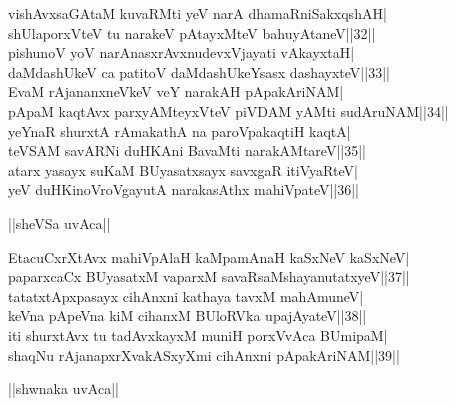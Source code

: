 \documentclass{article}
\begin{document}
vishAvxsaGAtaM kuvaRMti yeV narA dhamaRniSakxqshAH|\\
shUlaporxVteV tu narakeV pAtayxMteV bahuyAtaneV||32||\\
pishunoV yoV narAnasxrAvxnudevxVjayati vAkayxtaH|\\
daMdashUkeV ca patitoV daMdashUkeYsasx dashayxteV||33||\\
EvaM rAjananxneVkeV veY narakAH pApakAriNAM|\\
pApaM kaqtAvx parxyAMteyxVteV piVDAM yAMti sudAruNAM||34||\\
yeYnaR shurxtA rAmakathA na paroVpakaqtiH kaqtA|\\
teVSAM savARNi duHKAni BavaMti narakAMtareV||35||\\
atarx yasayx suKaM BUyasatxsayx savxgaR itiVyaRteV|\\
yeV duHKinoVroVgayutA narakasAthx mahiVpateV||36||\\

\begin{center}
||sheVSa uvAca||
\end{center}

EtacuCxrXtAvx mahiVpAlaH kaMpamAnaH kaSxNeV kaSxNeV|\\
paparxcaCx BUyasatxM vaparxM savaRsaMshayanutatxyeV||37||\\
tatatxtApxpasayx cihAnxni kathaya tavxM mahAmuneV|\\
keVna pApeVna kiM cihanxM BUloRVka upajAyateV||38||\\
iti shurxtAvx tu tadAvxkayxM muniH porxVvAca BUmipaM|\\
shaqNu rAjanapxrXvakASxyXmi cihAnxni pApakAriNAM||39||\\

\begin{center}
||shwnaka uvAca||
\end{center}
\end{document}

